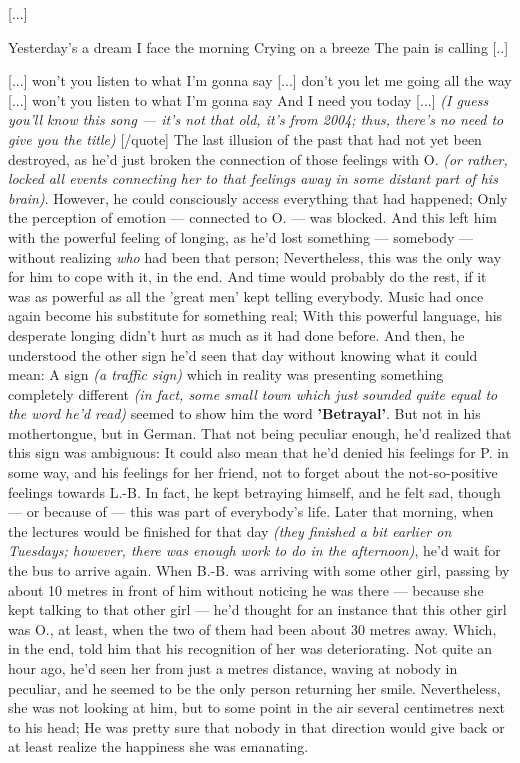 [...]

Yesterday's a dream 
I face the morning 
Crying on a breeze 
The pain is calling 
[..]

[...] won't you listen to what I'm gonna say 
[...] don't you let me going all the way 
[...] won't you listen to what I'm gonna say 
And I need you today 
[...]
\emph{(I guess you'll know this song --- it's not that old, it's from 2004; thus, there's no need to give you the title)}
[/quote]
The last illusion of the past that had not yet been destroyed, as he'd just broken the connection of those feelings with O. \emph{(or rather, locked all events connecting her to that feelings away in some distant part of his brain)}. However, he could consciously access everything that had happened; Only the perception of emotion --- connected to O. --- was blocked. 
And this left him with the powerful feeling of longing, as he'd lost something --- somebody --- without realizing \emph{who} had been that person; Nevertheless, this was the only way for him to cope with it, in the end. 
And time would probably do the rest, if it was as powerful as all the 'great men' kept telling everybody. 
Music had once again become his substitute for something real; With this powerful language, his desperate longing didn't hurt as much as it had done before. And then, he understood the other sign he'd seen that day without knowing what it could mean: A sign \emph{(a traffic sign)} which in reality was presenting something completely different \emph{(in fact, some small town which just sounded quite equal to the word he'd read)} seemed to show him the word \textbf{'Betrayal'}. 
But not in his mothertongue, but in German. 
That not being peculiar enough, he'd realized that this sign was ambiguous: It could also mean that he'd denied his feelings for P. in some way, and his feelings for her friend, not to forget about the not-so-positive feelings towards L.-B. In fact, he kept betraying himself, and he felt sad, though --- or because of --- this was part of everybody's life. 
Later that morning, when the lectures would be finished for that day \emph{(they finished a bit earlier on Tuesdays; however, there was enough work to do in the afternoon)}, he'd wait for the bus to arrive again. When B.-B. was arriving with some other girl, passing by about 10 metres in front of him without noticing he was there --- because she kept talking to that other girl --- he'd thought for an instance that this other girl was O., at least, when the two of them had been about 30 metres away. 
Which, in the end, told him that his recognition of her was deteriorating. Not quite an hour ago, he'd seen her from just a metres distance, waving at nobody in peculiar, and he seemed to be the only person returning her smile. Nevertheless, she was not looking at him, but to some point in the air several centimetres next to his head; He was pretty sure that nobody in that direction would give back or at least realize the happiness she was emanating. 

